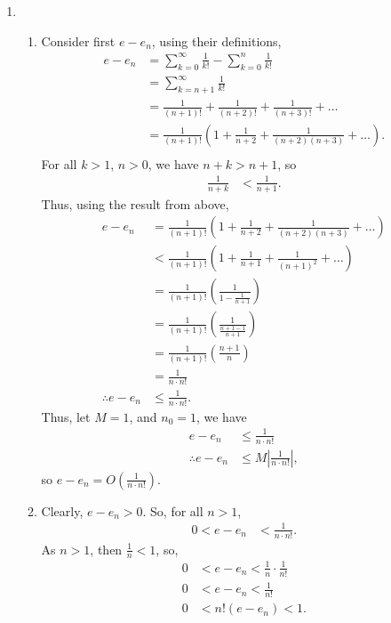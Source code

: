 \documentclass[a4paper,11pt]{article}
\newcommand{\ds}{\displaystyle}
\begin{document}
{{\begin{enumerate}[leftmargin=*]
		\item 
			\begin{enumerate}
				\item Consider first $\ds{e - e_n}$, using their definitions, 
					\begin{align*}
						e - e_n & = \sum^{\infty}_{k=0} \frac{1}{k!} - \sum^{n}_{k=0} \frac{1}{k!}
\\
								& = \sum^{\infty}_{k=n+1} \frac{1}{k!}\\
								& = \frac{1}{(n+1)!} + \frac{1}{(n+2)!} + \frac{1}{(n+3)!} + \dots \\
								& = \frac{1}{(n+1)!}\left(1 + \frac{1}{n+2} + \frac{1}{(n+2)(n+3)} + \dots \right).\\
					\end{align*}
					For all $\ds{k > 1}$, $\ds{n > 0}$, we have $\ds{n + k > n + 1}$, so
					\begin{align*}
						\frac{1}{n+k} & < \frac{1}{n+1}.
					\end{align*}
					Thus, using the result from above,
					\begin{align*}
						e - e_n & = \frac{1}{(n+1)!}\left(1 + \frac{1}{n+2} + \frac{1}{(n+2)(n+3)} + \dots \right)\\
								& < \frac{1}{(n+1)!}\left(1 + \frac{1}{n+1} + \frac{1}{(n+1)^2} + \dots \right)\\
								& = \frac{1}{(n+1)!}\left(\frac{1}{1 - \frac{1}{n+1}}\right)\\
								& = \frac{1}{(n+1)!}\left(\frac{1}{\frac{n+1-1}{n+1}}\right)\\
								& = \frac{1}{(n+1)!}\left(\frac{n+1}{n}\right)\\
								& = \frac{1}{n\cdot n!}\\
						\therefore e - e_n & \leq \frac{1}{n\cdot n!}.
					\end{align*}
					Thus, let $\ds{M = 1}$, and $\ds{n_0 = 1}$, we have
					\begin{align*}
						e - e_n & \leq \frac{1}{n\cdot n!}\\
						\therefore e - e_n & \leq M \left|\frac{1}{n \cdot n!}\right|,
					\end{align*}
					so $\ds{e - e_n = O\left(\frac{1}{n\cdot n!}\right)}$.
					\pagebreak

				\item Clearly, $\ds{e - e_n > 0}$. So, for all $\ds{n > 1}$,
					\begin{align*}
						0 < e - e_n & < \frac{1}{n \cdot n!}.
					\end{align*}
					As $\ds{n > 1}$, then $\ds{\frac{1}{n} < 1}$, so,
					\begin{align*}
						0 & < e - e_n < \frac{1}{n}\cdot \frac{1}{n!}\\
						0 & < e - e_n < \frac{1}{n!}\\
						0 & < n!(e - e_n) < 1.
					\end{align*}
					\bigbreak


\end{enumerate}
\end{enumerate}}}
\end{document}
